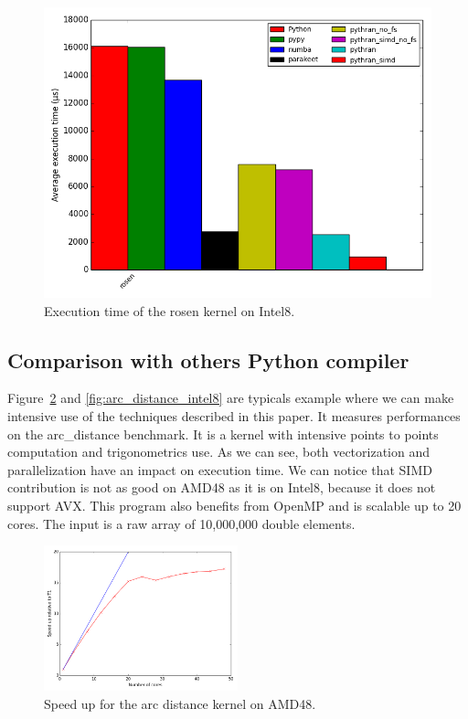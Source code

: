\documentclass[10pt, preprint]{sigplanconf}
\begin{document}
\begin{figure}[t]
\centering
\includegraphics[width=.5\textwidth]{rosen_intel8.png}
\caption{Execution time of the rosen kernel on Intel8.}
\label{fig:rosenintel8}
\end{figure}


\subsection{Comparison with others Python compiler}

Figure~\ref{fig:arc_distance} and \ref{fig:arc_distance_intel8} are typicals
example where we can make intensive
use of the techniques described in this paper. It measures performances on the
arc\_distance benchmark. It is a kernel with intensive points to points computation
and trigonometrics use. As we can see, both vectorization
and parallelization have an impact on execution time. We can notice that SIMD
contribution is not as good on AMD48 as it is on Intel8, because it does not
support AVX. This program also benefits from OpenMP and is scalable up to 20 cores.
The input is a raw array of 10,000,000 double elements.

\begin{figure}[t]
\centering
\includegraphics[width=0.5\textwidth]{arc_distance_amd48.png}
\caption{Speed up for the arc distance kernel on AMD48.}
\label{fig:arc_distance}
\end{figure}
\end{document}
